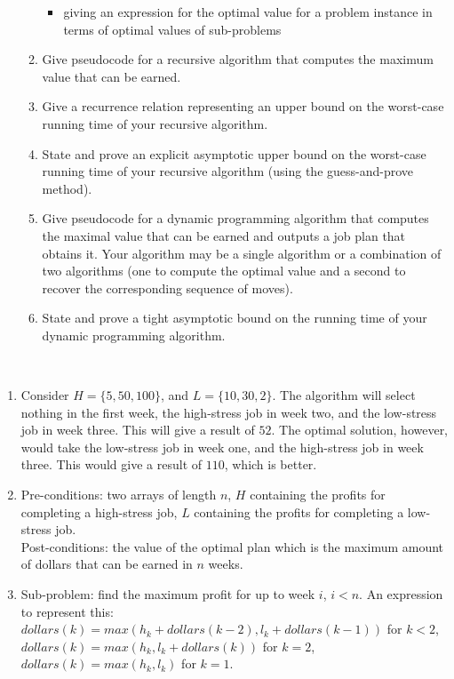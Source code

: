 \documentclass{assignment}
\begin{document}
\begin{problemlist}
\begin{problem}
\begin{enumerate}
\begin{enumerate}
\begin{itemize}
\item giving an expression for the optimal value for a problem instance in terms of optimal values of sub-problems
\end{itemize}
\item Give pseudocode for a recursive algorithm that computes the maximum value that can be earned.
\item Give a recurrence relation representing an upper bound on the worst-case running time of your recursive algorithm.
\item State and prove an explicit asymptotic upper bound on the worst-case running time of your recursive algorithm (using the guess-and-prove method).
\item Give pseudocode for a dynamic programming algorithm that computes the maximal value that can be earned and outputs a job plan that obtains it. Your algorithm may be a single algorithm or a combination of two algorithms (one to compute the optimal value and a second to recover the corresponding sequence of moves).
\item State and prove a tight asymptotic bound on the running time of your dynamic programming algorithm.
\end{enumerate}
\end{enumerate}
\end{problem}
\begin{answer}
\\
\clearpage
\begin{enumerate}
\item
Consider $H=\{5, 50, 100\}$, and $L=\{10, 30, 2\}$. The algorithm will select nothing in the first week, the high-stress job in week two, and the low-stress job in week three. This will give a result of $52$. The optimal solution, however, would take the low-stress job in week one, and the high-stress job in week three. This would give a result of $110$, which is better.\\
\item
Pre-conditions: two arrays of length $n$, $H$ containing the profits for completing a high-stress job, $L$ containing the profits for completing a low-stress job.\\
Post-conditions: the value of the optimal plan which is the maximum amount of dollars that can be earned in $n$ weeks.\\
\item
Sub-problem: find the maximum profit for up to week $i$, $i<n$.
An expression to represent this: $dollars(k) = max(h_k + dollars(k-2), l_k + dollars(k-1))$ for $k < 2$, $dollars(k) = max(h_k, l_k + dollars(k))$ for $k=2$, $dollars(k) = max(h_k, l_k)$ for $k=1$.\\

\end{enumerate}
\end{answer}
\end{problemlist}
\end{document}
